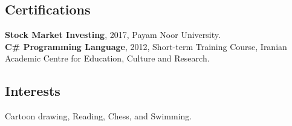 \documentclass[10pt]{article}
\begin{document}
\subsection*{Certifications}
\noindent \textbf{Stock Market Investing}, 2017, Payam Noor University.\\
\noindent \textbf{C\# Programming Language}, 2012, Short-term Training Course, Iranian Academic Centre for Education, Culture and Research.

\subsection*{Interests}
Cartoon drawing, Reading, Chess, and Swimming.
\end{document}
